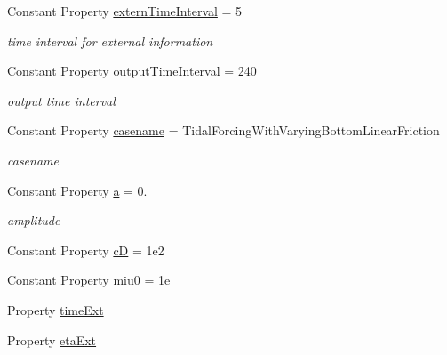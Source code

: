 \begin{DoxyCompactItemize}
Constant Property \hyperlink{class_open_channel_varying_bottom3d_a8e0a05c976d06a746b1de292fcdcd5a1}{extern\+Time\+Interval} = 5
\begin{DoxyCompactList}\small\item\em time interval for external information \end{DoxyCompactList}\item 
Constant Property \hyperlink{class_open_channel_varying_bottom3d_ac30724d074e7732503147485dd065ed1}{output\+Time\+Interval} = 240
\begin{DoxyCompactList}\small\item\em output time interval \end{DoxyCompactList}\item 
Constant Property \hyperlink{class_open_channel_varying_bottom3d_a9b58bd55f67415c1262536b5a118a391}{casename} = \textquotesingle{}Tidal\+Forcing\+With\+Varying\+Bottom\+Linear\+Friction\textquotesingle{}
\begin{DoxyCompactList}\small\item\em casename \end{DoxyCompactList}\item 
Constant Property \hyperlink{class_open_channel_varying_bottom3d_a2b34fc2aa33abc22c3482938ef6a6d8a}{a} = 0.
\begin{DoxyCompactList}\small\item\em amplitude \end{DoxyCompactList}\item 
Constant Property \hyperlink{class_open_channel_varying_bottom3d_a22f68972215462c428a42d54a9b52e16}{cD} = 1e2
\item 
Constant Property \hyperlink{class_open_channel_varying_bottom3d_a3286c949963fd688d2112c471e99cd78}{miu0} = 1e
\item 
Property \hyperlink{class_open_channel_varying_bottom3d_a56ff659cf018513f4078576b3b089109}{time\+Ext}
\item 
Property \hyperlink{class_open_channel_varying_bottom3d_af9f5131d6b648db3a59015b68636d4b4}{eta\+Ext}
\end{DoxyCompactItemize}
